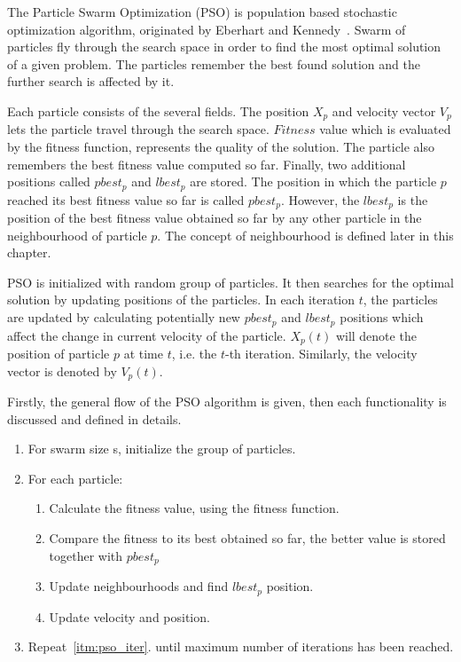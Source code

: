 \documentclass{mini}
\begin{document}
The Particle Swarm Optimization (PSO) is population based stochastic optimization algorithm, originated by Eberhart and Kennedy~\cite{pso_origin}. Swarm of particles fly through the search space in order to find the most optimal solution of a given problem. The particles remember the best found solution and the further search is affected by it.

Each particle consists of the several fields. The position $X_p$ and velocity vector $V_p$ lets the particle travel through the search space. $Fitness$ value which is evaluated by the fitness function, represents the quality of the solution. The particle also remembers the best fitness value computed so far. Finally, two additional positions called $pbest_p$ and $lbest_p$ are stored. The position in which the particle $p$ reached its best fitness value so far is called $pbest_p$. However, the $lbest_p$ is the position of the best fitness value obtained so far by any other particle in the neighbourhood of particle $p$. The concept of neighbourhood is defined later in this chapter.

PSO is initialized with random group of particles. It then searches for the optimal solution by updating positions of the particles.
In each iteration $t$, the particles are updated by calculating potentially new $pbest_p$ and $lbest_p$ positions which affect the change in current velocity of the particle. $X_p(t)$ will denote the position of particle $p$ at time $t$, i.e. the $t$-th iteration. Similarly, the velocity vector is denoted by $V_p(t)$.

Firstly, the general flow of the PSO algorithm is given, then each functionality is discussed and defined in details.

\begin{center}
    
    \begin{enumerate}
        \item For swarm size s, initialize the group of particles.
        
        \item For each particle: \label{itm:pso_iter}
        \begin{enumerate}
            \item Calculate the fitness value, using the fitness function.
            \item Compare the fitness to its best obtained so far, the better value is stored together with $pbest_p$	
            
            \item Update neighbourhoods and find $lbest_p$ position.
            
            \item Update velocity and position.	
        \end{enumerate}
        
        \item Repeat~\ref{itm:pso_iter}. until maximum number of iterations has been reached.
        
    \end{enumerate}
    
\end{center}
\end{document}
